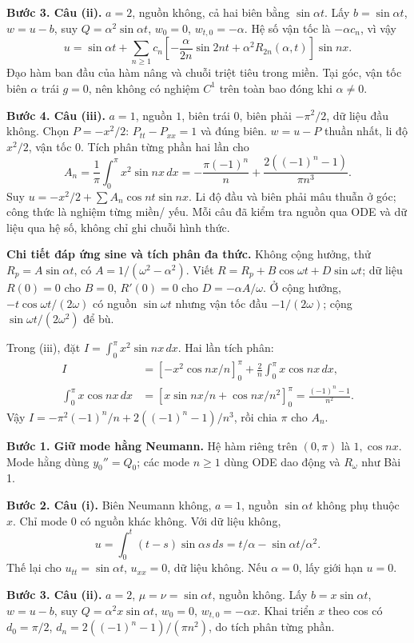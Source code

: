 \textbf{Bước 3. Câu (ii).} $a=2$, nguồn không, cả hai biên bằng $\sin\alpha t$. Lấy $b=\sin\alpha t$, $w=u-b$, suy $Q=\alpha^2\sin\alpha t$, $w_0=0$, $w_{t,0}=-\alpha$. Hệ số vận tốc là $-\alpha c_n$, vì vậy
\[u=\sin\alpha t+\sum_{n\ge1}c_n\left[-\frac\alpha{2n}\sin2nt+\alpha^2R_{2n}(\alpha,t)\right]\sin nx.\]
Đạo hàm ban đầu của hàm nâng và chuỗi triệt tiêu trong miền. Tại góc, vận tốc biên $\alpha$ trái $g=0$, nên không có nghiệm $C^1$ trên toàn bao đóng khi $\alpha\ne0$.

\textbf{Bước 4. Câu (iii).} $a=1$, nguồn $1$, biên trái $0$, biên phải $-\pi^2/2$, dữ liệu đầu không. Chọn $P=-x^2/2$: $P_{tt}-P_{xx}=1$ và đúng biên. $w=u-P$ thuần nhất, li độ $x^2/2$, vận tốc $0$. Tích phân từng phần hai lần cho
\[A_n=\frac1\pi\int_0^\pi x^2\sin nx\,dx
=-\frac{\pi(-1)^n}{n}+\frac{2((-1)^n-1)}{\pi n^3}.\]
Suy $u=-x^2/2+\sum A_n\cos nt\sin nx$. Li độ đầu và biên phải mâu thuẫn ở góc; công thức là nghiệm từng miền/ yếu. Mỗi câu đã kiểm tra nguồn qua ODE và dữ liệu qua hệ số, không chỉ ghi chuỗi hình thức.

\textbf{Chi tiết đáp ứng sine và tích phân đa thức.} Không cộng hưởng, thử $R_p=A\sin\alpha t$, có $A=1/(\omega^2-\alpha^2)$. Viết $R=R_p+B\cos\omega t+D\sin\omega t$; dữ liệu $R(0)=0$ cho $B=0$, $R'(0)=0$ cho $D=-\alpha A/\omega$. Ở cộng hưởng, $-t\cos\omega t/(2\omega)$ có nguồn $\sin\omega t$ nhưng vận tốc đầu $-1/(2\omega)$; cộng $\sin\omega t/(2\omega^2)$ để bù.

Trong (iii), đặt $I=\int_0^\pi x^2\sin nx\,dx$. Hai lần tích phân:
\[\begin{aligned}
I&=\left[-x^2\cos nx/n\right]_0^\pi+\frac2n\int_0^\pi x\cos nx\,dx,\\
\int_0^\pi x\cos nx\,dx
&=\left[x\sin nx/n+\cos nx/n^2\right]_0^\pi
=\frac{(-1)^n-1}{n^2}.
\end{aligned}\]
Vậy $I=-\pi^2(-1)^n/n+2((-1)^n-1)/n^3$, rồi chia $\pi$ cho $A_n$.

\textbf{Bước 1. Giữ mode hằng Neumann.} Hệ hàm riêng trên $(0,\pi)$ là $1,\cos nx$. Mode hằng dùng $y_0''=Q_0$; các mode $n\ge1$ dùng ODE dao động và $R_\omega$ như Bài 1.

\textbf{Bước 2. Câu (i).} Biên Neumann không, $a=1$, nguồn $\sin\alpha t$ không phụ thuộc $x$. Chỉ mode $0$ có nguồn khác không. Với dữ liệu không,
\[u=\int_0^t(t-s)\sin\alpha s\,ds=t/\alpha-\sin\alpha t/\alpha^2.\]
Thế lại cho $u_{tt}=\sin\alpha t$, $u_{xx}=0$, dữ liệu không. Nếu $\alpha=0$, lấy giới hạn $u=0$.

\textbf{Bước 3. Câu (ii).} $a=2$, $\mu=\nu=\sin\alpha t$, nguồn không. Lấy $b=x\sin\alpha t$, $w=u-b$, suy $Q=\alpha^2x\sin\alpha t$, $w_0=0$, $w_{t,0}=-\alpha x$. Khai triển $x$ theo cos có $d_0=\pi/2$, $d_n=2((-1)^n-1)/(\pi n^2)$, do tích phân từng phần.

